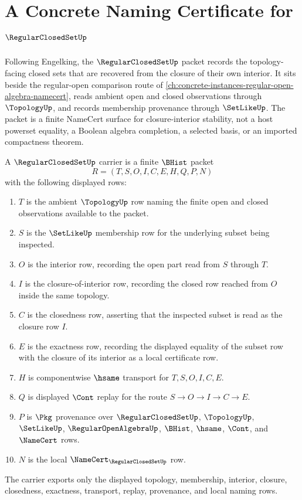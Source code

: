 \chapter{A Concrete Naming Certificate for $\RegularClosedSetUp$}
\label{ch:concrete-instances-regular-closed-set-namecert}

Following Engelking, the $\RegularClosedSetUp$ packet records the topology-facing closed sets that are recovered from the closure of their own interior. It sits beside the regular-open comparison route of \autoref{ch:concrete-instances-regular-open-algebra-namecert}, reads ambient open and closed observations through $\TopologyUp$, and records membership provenance through $\SetLikeUp$. The packet is a finite NameCert surface for closure-interior stability, not a host powerset equality, a Boolean algebra completion, a selected basis, or an imported compactness theorem.

\begin{definition}
\label{def:regular-closed-set-carrier}
A $\RegularClosedSetUp$ carrier is a finite $\BHist$ packet
$$
R=(T,S,O,I,C,E,H,Q,P,N)
$$
with the following displayed rows:
\begin{enumerate}
\item $T$ is the ambient $\TopologyUp$ row naming the finite open and closed observations available to the packet.
\item $S$ is the $\SetLikeUp$ membership row for the underlying subset being inspected.
\item $O$ is the interior row, recording the open part read from $S$ through $T$.
\item $I$ is the closure-of-interior row, recording the closed row reached from $O$ inside the same topology.
\item $C$ is the closedness row, asserting that the inspected subset is read as the closure row $I$.
\item $E$ is the exactness row, recording the displayed equality of the subset row with the closure of its interior as a local certificate row.
\item $H$ is componentwise $\hsame$ transport for $T,S,O,I,C,E$.
\item $Q$ is displayed $\Cont$ replay for the route $S \to O \to I \to C \to E$.
\item $P$ is $\Pkg$ provenance over $\RegularClosedSetUp$, $\TopologyUp$, $\SetLikeUp$, $\RegularOpenAlgebraUp$, $\BHist$, $\hsame$, $\Cont$, and $\NameCert$ rows.
\item $N$ is the local $\NameCert_{\RegularClosedSetUp}$ row.
\end{enumerate}
The carrier exports only the displayed topology, membership, interior, closure, closedness, exactness, transport, replay, provenance, and local naming rows.
\end{definition}

